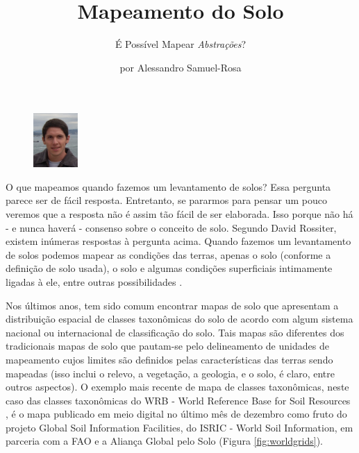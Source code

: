 \title{Mapeamento do Solo}
\subtitle{É Possível Mapear \textit{Abstrações}?}
\author{por Alessandro Samuel-Rosa}
\maketitle




\begin{figure}
\includegraphics[width=0.15\textwidth]{figuras/alessandro}
\end{figure}




O que mapeamos quando fazemos um levantamento de solos? Essa pergunta parece ser de fácil resposta. Entretanto, se pararmos para pensar um pouco veremos que a resposta não é assim tão fácil de ser elaborada. Isso porque não há - e nunca haverá - consenso sobre o conceito de solo. Segundo David Rossiter, existem inúmeras respostas à pergunta acima. Quando fazemos um levantamento de solos podemos mapear as condições das terras, apenas o solo (conforme a definição de solo usada), o solo e algumas condições superficiais intimamente ligadas à ele, entre outras possibilidades \citep{Rossiter2000}.




Nos últimos anos, tem sido comum encontrar mapas de solo que apresentam a distribuição espacial de classes taxonômicas do solo de acordo com algum sistema nacional ou internacional de classificação do solo. Tais mapas são diferentes dos tradicionais mapas de solo que pautam-se pelo delineamento de unidades de mapeamento cujos limites são definidos pelas características das terras sendo mapeadas (isso inclui o relevo, a vegetação, a geologia, e o solo, é claro, entre outros aspectos). O exemplo mais recente de mapa de classes taxonômicas, neste caso das classes taxonômicas do WRB - World Reference Base for Soil Resources \citep{fao2007}, é o mapa publicado em meio digital no último mês de dezembro como fruto do projeto Global Soil Information Facilities, do ISRIC - World Soil Information, em parceria com a FAO e a Aliança Global pelo Solo (Figura \ref{fig:worldgrids}).




